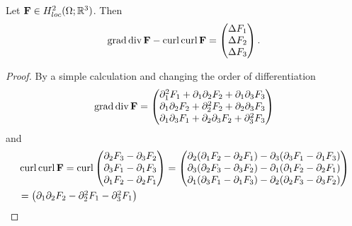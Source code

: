 \documentclass[../main.tex]{subfiles}
\begin{document}
\begin{lemma}\label{lem:graddiv_curlcurl_equals_componentwise_laplacian}
    Let $\mathbf{F} \in H^2_{loc}(\Omega;\mathbb{R}^3)$. Then 
    \begin{align*}
        \operatorname{grad} \operatorname{div} \mathbf{F} - \operatorname{curl} \operatorname{curl} \mathbf{F} 
        = \begin{pmatrix} \Delta F_1 \\ \Delta F_2 
            \\ \Delta F_3  \end{pmatrix}.
    \end{align*}
\end{lemma}
\begin{proof}
    By a simple calculation and changing the order of differentiation
    \begin{align*}
        \operatorname{grad} \operatorname{div} \mathbf{F} = 
            \begin{pmatrix} \partial_1^2 F_1 + \partial_1 \partial_2 F_2
                + \partial_1 \partial_3 F_3
            \\ \partial_1\partial_2 F_2 + \partial_2^2 F_2 + 
                \partial_2\partial_3 F_3
            \\ \partial_1 \partial_3 F_1 + \partial_2\partial_3 F_2
                + \partial_3^2 F_3
            \end{pmatrix}
    \end{align*}
    and 
    \begin{align*}
        &\operatorname{curl} \operatorname{curl} \mathbf{F} = \operatorname{curl} \begin{pmatrix} 
            \partial_2 F_3 - \partial_3 F_2 \\ \partial_3 F_1 - \partial_1 F_3 
            \\ \partial_1 F_2 - \partial_2 F_1  \end{pmatrix}
        = \begin{pmatrix} 
            \partial_2 (\partial_1 F_2 - \partial_2 F_1)
                - \partial_3 (\partial_3 F_1 - \partial_1 F_3)
            \\ \partial_3 (\partial_2 F_3 - \partial_3 F_2)
                - \partial_1 (\partial_1 F_2 - \partial_2 F_1)
            \\ \partial_1 (\partial_3 F_1 - \partial_1 F_3)
                - \partial_2 (\partial_2 F_3 - \partial_3 F_2)  
            \end{pmatrix}
        \\ &= \begin{pmatrix}
            \partial_1 \partial_2 F_2 - \partial^2_2 F_1 - \partial_3^2 F_1

\end{pmatrix}
\end{align*}
\end{proof}
\end{document}
